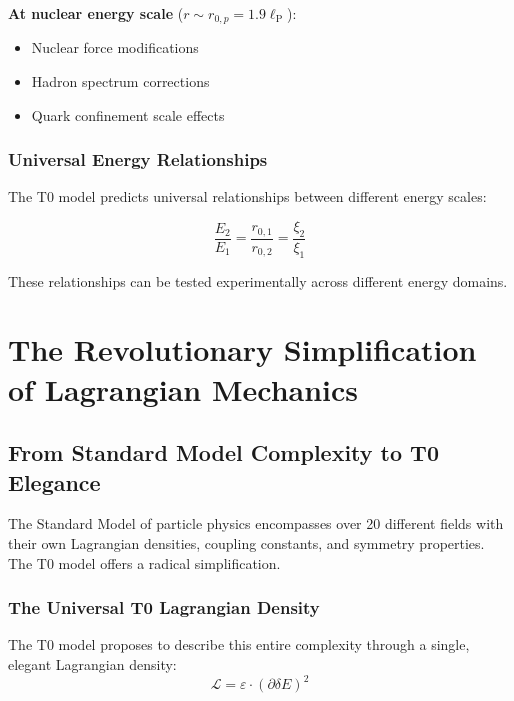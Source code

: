 \documentclass[12pt,a4paper]{report}
\newcommand{\lP}{\ell_{\text{P}}}         %
\begin{document}
	\textbf{At nuclear energy scale} ($r \sim r_{0,p} = 1.9 \lP$):
	\begin{itemize}
		\item Nuclear force modifications
		\item Hadron spectrum corrections
		\item Quark confinement scale effects
	\end{itemize}
	
	\subsection{Universal Energy Relationships}\label{subsec:universal_energy_relationships}
	
	The T0 model predicts universal relationships between different energy scales:
	
	\begin{equation}
		\frac{E_2}{E_1} = \frac{r_{0,1}}{r_{0,2}} = \frac{\xi_{2}}{\xi_{1}}
		\label{eq:universal_energy_ratios}
	\end{equation}
	
	These relationships can be tested experimentally across different energy domains.
	
	\chapter{The Revolutionary Simplification of Lagrangian Mechanics}
	\label{chap:lagrange}
	
	\section{From Standard Model Complexity to T0 Elegance}
	
	The Standard Model of particle physics encompasses over 20 different fields with their own Lagrangian densities, coupling constants, and symmetry properties. The T0 model offers a radical simplification.
	
	\subsection{The Universal T0 Lagrangian Density}
	
	The T0 model proposes to describe this entire complexity through a single, elegant Lagrangian density:
	\begin{equation}
		\boxed{\mathcal{L} = \varepsilon \cdot (\partial\delta E)^2}
		\label{eq:universal_lagrangian}
	\end{equation}
	
\end{document}
